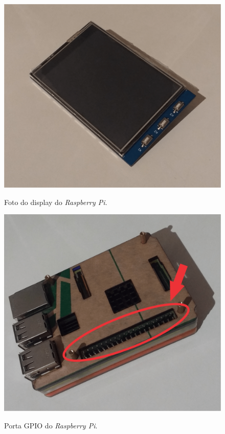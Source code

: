 \begin{figure}[!ht]
\centering
\caption{Foto do display do \textit{Raspberry Pi}.} 
{\includegraphics[scale=.12]{imagens/displayRaspberry-min.png}}\\
 \label{Fig:raspberry_display}
\end{figure}

\begin{figure}[!ht]
\centering
\caption{Porta GPIO do \textit{Raspberry Pi}.} 
{\includegraphics[scale=.12]{imagens/raspberryGPIO-min.png}}\\
 \label{Fig:raspberry_gpio}
\end{figure}

